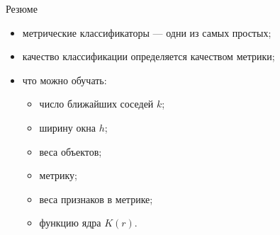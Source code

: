 \documentclass{beamer}
\begin{document}
\begin{frame}{Резюме}
    \begin{itemize}
        \item метрические классификаторы --- одни из самых простых;
        \item качество классификации определяется качеством метрики;
        \item что можно обучать:
        \begin{itemize}
            \item число ближайших соседей $k$;
            \item ширину окна $h$;
            \item веса объектов;
            \item метрику;
            \item веса признаков в метрике;
            \item функцию ядра $K(r)$.
        \end{itemize}
    \end{itemize}
\end{frame}
\end{document}
